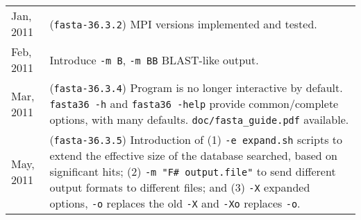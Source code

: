 \begin{longtable}{p{0.75 in}p{5.25 in}}
Jan, 2011 & (\texttt{fasta-36.3.2}) MPI versions implemented and tested.\\[1ex]

Feb, 2011 & Introduce \texttt{-m B}, \texttt{-m BB} BLAST-like output.\\[1.0ex]

Mar, 2011 & (\texttt{fasta-36.3.4}) Program is no longer interactive by
default. \texttt{fasta36 -h} and \texttt{fasta36 -help} provide
common/complete options, with many defaults. \texttt{doc/fasta\_guide.pdf} available.\\[1.0ex]

May, 2011 & (\texttt{fasta-36.3.5}) Introduction of (1) \texttt{-e
  expand.sh} scripts to extend the effective size of the database
searched, based on significant hits; (2) \texttt{-m "F\# output.file"}
to send different output formats to different files; and (3)
\texttt{-X} expanded options, \texttt{-o} replaces the old \texttt{-X}
and \texttt{-Xo} replaces \texttt{-o}. \\[1.0ex]

\hline
\end{longtable}
